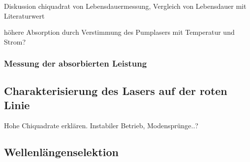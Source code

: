 Diskussion chiquadrat von Lebensdauermessung, Vergleich von Lebensdauer mit Literaturwert

höhere Absorption durch Verstimmung des Pumplasers mit Temperatur und Strom?

\subsubsection{Messung der absorbierten Leistung}

\subsection{Charakterisierung des Lasers auf der roten Linie}
Hohe Chiquadrate erklären. Instabiler Betrieb, Modensprünge..?


\subsection{Wellenlängenselektion}